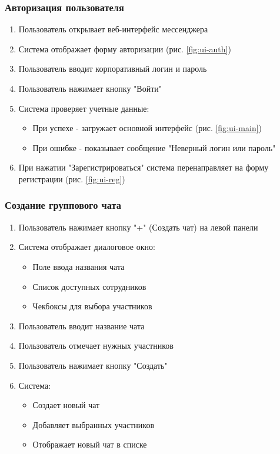 \subsubsection{Авторизация пользователя}
\begin{enumerate}
	\item Пользователь открывает веб-интерфейс мессенджера
	\item Система отображает форму авторизации (рис. \ref{fig:ui-auth})
	\item Пользователь вводит корпоративный логин и пароль
	\item Пользователь нажимает кнопку "Войти"
	\item Система проверяет учетные данные:
	\begin{itemize}
		\item При успехе - загружает основной интерфейс (рис. \ref{fig:ui-main})
		\item При ошибке - показывает сообщение "Неверный логин или пароль"
	\end{itemize}
	\item При нажатии "Зарегистрироваться" система перенаправляет на форму регистрации (рис. \ref{fig:ui-reg})
\end{enumerate}

\subsubsection{Создание группового чата}
\begin{enumerate}
	\item Пользователь нажимает кнопку "+" (Создать чат) на левой панели
	\item Система отображает диалоговое окно:
	\begin{itemize}
		\item Поле ввода названия чата
		\item Список доступных сотрудников
		\item Чекбоксы для выбора участников
	\end{itemize}
	\item Пользователь вводит название чата
	\item Пользователь отмечает нужных участников
	\item Пользователь нажимает кнопку "Создать"
	\item Система:
	\begin{itemize}
		\item Создает новый чат
		\item Добавляет выбранных участников
		\item Отображает новый чат в списке
	\end{itemize}
\end{enumerate}


